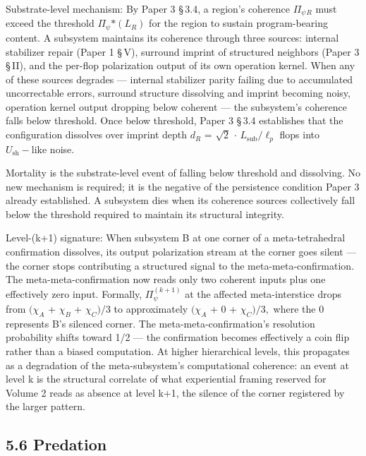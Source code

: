\documentclass[11pt,oneside]{report}
\theoremstyle{definition}
\theoremstyle{remark}
\begin{document}
Substrate-level mechanism: By Paper 3 \S\,3.4, a region's coherence
\textbar \ensuremath{\Pi_{\psi}}\textbar\ensuremath{_{R}} must exceed the threshold
\textbar \ensuremath{\Pi_{\psi}}\textbar\ensuremath{*(L_{R})} for the region to sustain program-bearing
content. A subsystem maintains its coherence through three sources:
internal stabilizer repair (Paper 1 \S\,V), surround imprint of structured
neighbors (Paper 3 \S\,II), and the per-flop polarization output of its own
operation kernel. When any of these sources degrades --- internal
stabilizer parity failing due to accumulated uncorrectable errors,
surround structure dissolving and imprint becoming noisy, operation
kernel output dropping below coherent --- the subsystem's coherence
falls below threshold. Once below threshold, Paper 3 \S\,3.4 establishes
that the configuration dissolves over imprint depth \ensuremath{d_{R}} = \ensuremath{\sqrt{2}} \ensuremath{\cdot}
\ensuremath{L_{\mathrm{sub}}/\ell_{p}} flops into \ensuremath{U_{\mathrm{sh}}-\text{like}} noise.

Mortality is the substrate-level event of falling below threshold and
dissolving. No new mechanism is required; it is the negative of the
persistence condition Paper 3 already established. A subsystem dies when
its coherence sources collectively fall below the threshold required to
maintain its structural integrity.

Level-(k+1) signature: When subsystem B at one corner of a
meta-tetrahedral confirmation dissolves, its output polarization stream
at the corner goes silent --- the corner stops contributing a structured
signal to the meta-meta-confirmation. The meta-meta-confirmation now
reads only two coherent inputs plus one effectively zero input.
Formally, \ensuremath{\Pi_{\psi}^{(k+1)}} at the affected meta-interstice drops from \ensuremath{(\chi_{A}}
+ \ensuremath{\chi_{B}} + \ensuremath{\chi_{C})/3} to approximately \ensuremath{(\chi_{A}} + 0 + \ensuremath{\chi_{C})/3,} where the 0
represents B's silenced corner. The meta-meta-confirmation's resolution
probability shifts toward 1/2 --- the confirmation becomes effectively a
coin flip rather than a biased computation. At higher hierarchical
levels, this propagates as a degradation of the meta-subsystem's
computational coherence: an event at level k is the structural correlate
of what experiential framing reserved for Volume 2 reads as absence at
level k+1, the silence of the corner registered by the larger pattern.

\subsection*{5.6 Predation}
\end{document}

